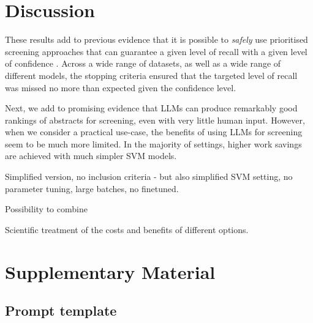 \documentclass{article}
\begin{document}
	
	\section*{Discussion}
	
	These results add to previous evidence that it is possible to \textit{safely} use prioritised screening approaches that can guarantee a given level of recall with a given level of confidence \cite{callaghan_statistical_2020}. Across a wide range of datasets, as well as a wide range of different models, the stopping criteria ensured that the targeted level of recall was missed no more than expected given the confidence level.
	
	Next, we add to promising evidence that LLMs can produce remarkably good rankings of abstracts for screening, even with very little human input. However, when we consider a practical use-case, the benefits of using LLMs for screening seem to be much more limited. In the majority of settings, higher work savings are achieved with much simpler SVM models.
	
	Simplified version, no inclusion criteria - but also simplified SVM setting, no parameter tuning, large batches, no finetuned.
	
	Possibility to combine
	
	Scientific treatment of the costs and benefits of different options. 
	
	
	
	
	
	
	
	\appendix
	
	\section*{Supplementary Material}
	
	\subsection*{Prompt template}
	
	
\end{document}
